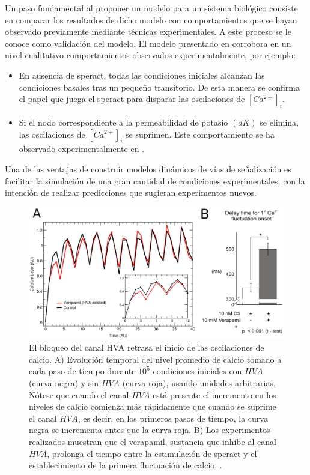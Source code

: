 Un paso fundamental al proponer un modelo para un sistema biológico consiste en comparar los resultados de dicho modelo con comportamientos que se hayan observado previamente mediante técnicas experimentales. A este proceso se le conoce como validación del modelo. El modelo presentado en \citeauthor{Espinal2011} \citep{Espinal2011} corrobora en un nivel cualitativo comportamientos observados experimentalmente, por ejemplo:
\begin{itemize}
\item En ausencia de speract, todas las condiciones iniciales alcanzan las condiciones basales tras un pequeño transitorio. De esta manera se confirma el papel que juega el speract para disparar las oscilaciones de $[Ca^{2+}]_i$.
\item Si el nodo correspondiente a la permeabilidad de potasio $(dK)$ se elimina, las oscilaciones de $[Ca^{2+}]_i$ se suprimen. Este comportamiento se ha observado experimentalmente en \citeauthor{Babcock:1992uf} \citep{Babcock:1992uf}.
\end{itemize}

Una de las ventajas de construir modelos dinámicos de vías de señalización es facilitar la simulación de una gran cantidad de condiciones experimentales, con la intención de realizar predicciones que sugieran experimentos nuevos.

\begin{figure}[hbt]
\includegraphics[width=0.9\linewidth]{gfx/figura8Chucho}
\caption[El bloqueo del canal HVA retrasa el inicio de las oscilaciones de calcio]{El bloqueo del canal HVA retrasa el inicio de las oscilaciones de calcio. A) Evolución temporal del nivel promedio de calcio tomado a cada paso de tiempo durante $10^5$ condiciones iniciales con $HVA$ (curva negra) y sin $HVA$ (curva roja), usando unidades arbitrarias. Nótese que cuando el canal $HVA$ está presente el incremento en los niveles de calcio comienza más rápidamente que cuando se suprime el canal $HVA$, es decir, en los primeros pasos de tiempo, la curva negra se incrementa antes que la curva roja. B) Los experimentos realizados muestran que el verapamil, sustancia que inhibe al canal $HVA$, prolonga el tiempo entre la estimulación de speract y el establecimiento de la primera fluctuación de calcio. \citeauthor{Espinal2011} \citep{Espinal2011}.}\label{fig:verapamil}
\end{figure}

